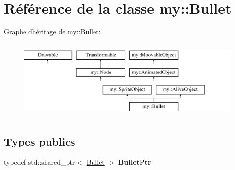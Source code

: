 \hypertarget{classmy_1_1Bullet}{}\section{Référence de la classe my\+:\+:Bullet}
\label{classmy_1_1Bullet}
Graphe d\textquotesingle{}héritage de my\+:\+:Bullet\+:\begin{figure}[H]
\begin{center}
\leavevmode
\includegraphics[height=4.000000cm]{classmy_1_1Bullet}
\end{center}
\end{figure}
\subsection*{Types publics}
\begin{DoxyCompactItemize}
\item 
\mbox{\label{classmy_1_1Bullet_a4b5c005e88ac1169b45ef54969763ddf}} 
typedef std\+::shared\+\_\+ptr$<$ \hyperlink{classmy_1_1Bullet}{Bullet} $>$ {\bfseries Bullet\+Ptr}
\end{DoxyCompactItemize}
